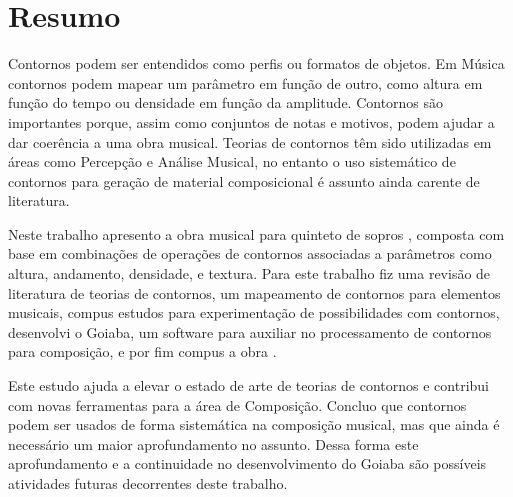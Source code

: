 \chapter*{Resumo}
\label{cha:resumo}

Contornos podem ser entendidos como perfis ou formatos de objetos. Em
Música contornos podem mapear um parâmetro em função de outro, como
altura em função do tempo ou densidade em função da
amplitude. Contornos são importantes porque, assim como conjuntos de
notas e motivos, podem ajudar a dar coerência a uma obra musical.
Teorias de contornos têm sido utilizadas em áreas como Percepção e
Análise Musical, no entanto o uso sistemático de contornos para
geração de material composicional é assunto ainda carente de
literatura.

Neste trabalho apresento a obra musical para quinteto de sopros
\obra{}, composta com base em combinações de operações de contornos
associadas a parâmetros como altura, andamento, densidade, e textura.
Para este trabalho fiz uma revisão de literatura de teorias de
contornos, um mapeamento de contornos para elementos musicais, compus
estudos para experimentação de possibilidades com contornos,
desenvolvi o Goiaba, um software para auxiliar no processamento de
contornos para composição, e por fim compus a obra \obra{}.

Este estudo ajuda a elevar o estado de arte de teorias de contornos e
contribui com novas ferramentas para a área de Composição.
Concluo que contornos podem ser usados de forma sistemática na
composição musical, mas que ainda é necessário um maior aprofundamento
no assunto. Dessa forma este aprofundamento e a continuidade no
desenvolvimento do Goiaba são possíveis atividades futuras decorrentes
deste trabalho.
